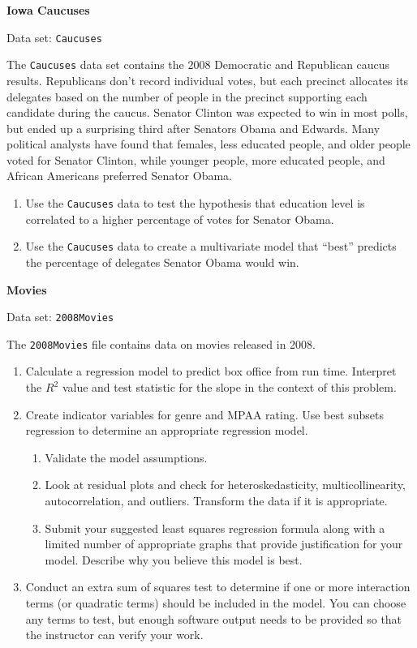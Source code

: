 \documentclass[
]{report}
\begin{document}
\begin{list}{E..}{ \setlength{\itemsep}{1.2em}}
  \item \textbf{Iowa Caucuses}

Data set: \texttt{Caucuses}

The \texttt{Caucuses} data set contains the $2008$ Democratic and Republican caucus results. Republicans don’t record individual votes, but each precinct allocates its delegates based on the number of people in the precinct supporting each candidate during the caucus. Senator Clinton was expected to win in most polls, but ended up a surprising third after Senators Obama and Edwards. Many political analysts have found that females, less educated people, and older people voted for Senator Clinton, while younger people, more educated people, and African Americans preferred Senator Obama.

    \begin{enumerate}
      \item Use the \texttt{Caucuses} data to test the hypothesis that education level is correlated to a higher percentage of votes for Senator Obama.
      \item Use the \texttt{Caucuses} data to create a multivariate model that “best” predicts the percentage of delegates Senator Obama would win.
    \end{enumerate}

  \item \textbf{Movies}

Data set: \texttt{2008Movies}

The \texttt{2008Movies} file contains data on movies released in 2008.

    \begin{enumerate}
      \item Calculate a regression model to predict box office from run time. Interpret the $R^2$ value and test statistic for the slope in the context of this problem.
      \item Create indicator variables for genre and MPAA rating. Use best subsets regression to determine an appropriate regression model.
        \begin{enumerate}
          \item Validate the model assumptions.
          \item Look at residual plots and check for heteroskedasticity, multicollinearity, autocorrelation, and outliers. Transform the data if it is appropriate.
          \item Submit your suggested least squares regression formula along with a limited number of appropriate graphs that provide justification for your model. Describe why you believe this model is best.
        \end{enumerate}
      \item Conduct an extra sum of squares test to determine if one or more interaction terms (or quadratic terms) should be included in the model. You can choose any terms to test, but enough software output needs to be provided so that the instructor can verify your work.
    \end{enumerate}

\end{list}
\end{document}
